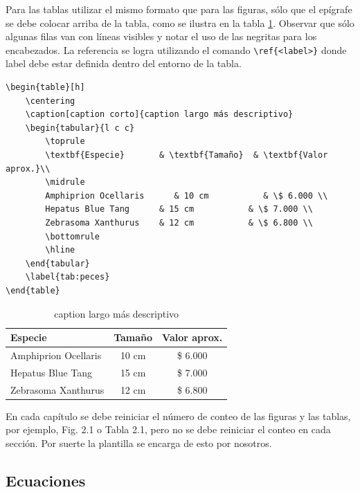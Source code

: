 Para las tablas utilizar el mismo formato que para las figuras, sólo que el epígrafe se debe colocar arriba de la tabla, como se ilustra en la tabla \ref{tab:peces}. Observar que sólo algunas filas van con líneas visibles y notar el uso de las negritas para los encabezados.  La referencia se logra utilizando el comando \verb|\ref{<label>}| donde label debe estar definida dentro del entorno de la tabla.

\begin{verbatim}
\begin{table}[h]
	\centering
	\caption[caption corto]{caption largo más descriptivo}
	\begin{tabular}{l c c}    
		\toprule
		\textbf{Especie}       & \textbf{Tamaño}  & \textbf{Valor aprox.}\\
		\midrule
		Amphiprion Ocellaris	  & 10 cm 			& \$ 6.000 \\		
		Hepatus Blue Tang      & 15 cm			 & \$ 7.000 \\
		Zebrasoma Xanthurus    & 12 cm			 & \$ 6.800 \\
		\bottomrule
		\hline
	\end{tabular}
	\label{tab:peces}
\end{table}
\end{verbatim}

\begin{table}[h]
	\centering
	\caption[caption corto]{caption largo más descriptivo}
	\begin{tabular}{l c c}    
		\toprule
		\textbf{Especie} 	 & \textbf{Tamaño}  & \textbf{Valor aprox.}  \\
		\midrule
		Amphiprion Ocellaris	 & 10 cm 			& \$ 6.000 \\		
		Hepatus Blue Tang	 & 15 cm				& \$ 7.000 \\
		Zebrasoma Xanthurus	 & 12 cm				& \$ 6.800 \\
		\bottomrule
		\hline
	\end{tabular}
	\label{tab:peces}
\end{table}

En cada capítulo se debe reiniciar el número de conteo de las figuras y las tablas, por ejemplo, Fig. 2.1 o Tabla 2.1, pero no se debe reiniciar el conteo en cada sección. Por suerte la plantilla se encarga de esto por nosotros.

\subsection{Ecuaciones}
\label{sec:Ecuaciones}


